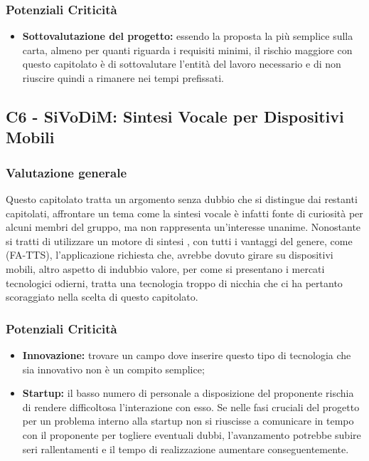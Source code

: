\subsubsection{Potenziali Criticità}

\begin{itemize}
	\item \textbf{Sottovalutazione del progetto:} essendo la proposta la più semplice sulla carta, almeno per quanti riguarda i requisiti minimi, il rischio maggiore con questo capitolato è di sottovalutare l'entità del lavoro necessario e di non riuscire quindi a rimanere nei tempi prefissati.
\end{itemize}


\subsection{C6 - SiVoDiM: Sintesi Vocale per Dispositivi Mobili}
\subsubsection{Valutazione generale}
Questo capitolato tratta un argomento senza dubbio che si distingue dai restanti capitolati, affrontare un tema come la sintesi vocale \`e infatti fonte di curiosit\`a per alcuni membri del gruppo, ma non rappresenta un'interesse unanime.
Nonostante si tratti di utilizzare un motore di sintesi , con tutti i vantaggi del genere, come  (FA-TTS), l'applicazione richiesta che, avrebbe dovuto girare su dispositivi mobili, altro aspetto di indubbio valore, per come si presentano i mercati tecnologici odierni, tratta una tecnologia troppo di nicchia che ci ha pertanto scoraggiato nella scelta di questo capitolato.

\subsubsection{Potenziali Criticità}

\begin{itemize}
	\item \textbf{Innovazione:} trovare un campo dove inserire questo tipo di tecnologia che sia innovativo non è un compito semplice;
\end{itemize}

\begin{itemize}
	\item \textbf{Startup:} il basso numero di personale a disposizione del proponente rischia di rendere difficoltosa l'interazione con esso. Se nelle fasi cruciali del progetto per un problema interno alla startup non si riuscisse a comunicare in tempo con il proponente per togliere eventuali dubbi, l'avanzamento potrebbe subire seri rallentamenti e il tempo di realizzazione aumentare conseguentemente.
\end{itemize}
